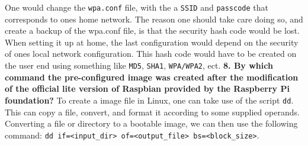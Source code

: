 \documentclass[a4paper,oneside,onecolumn]{article}
\newcommand{\code}[1]{\colorbox{codegray}{\texttt{#1}}}
\begin{document}
\newline
\newline
One would change the \texttt{wpa.conf} file, with the a \texttt{SSID} and \texttt{passcode} that corresponds to ones home network. The reason one should take care doing so, and create a backup of the wpa.conf file, is that the security hash code would be lost. When setting it up at home, the last configuration would depend on the security of ones local network configuration. This hash code would have to be created on the user end using something like \texttt{MD5}, \texttt{SHA1}, \texttt{WPA/WPA2}, ect.
\newline
\newline
\noindent
\textbf{8. By which command the pre-configured image was created after the modification of the official lite
version of Raspbian provided by the Raspberry Pi foundation?}
\newline
\newline
To create a image file in Linux, one can take use of the script \code{dd}. This can copy a file, convert, and format it according to some supplied operands. Converting a file or directory to a bootable image, we can then use the following command: \code{dd if=<input\_dir> of=<output\_file> bs=<block\_size>}. 
\end{document}
